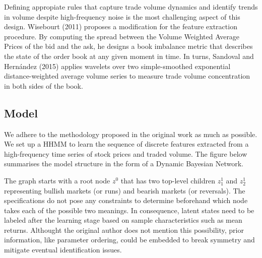 \documentclass[]{article}
\begin{document}
Defining appropiate rules that capture trade volume dynamics and
identify trends in volume despite high-frequency noise is the most
challenging aspect of this design. Wisebourt (2011) proposes a
modification for the feature extraction procedure. By computing the
spread between the Volume Weighted Average Prices of the bid and the
ask, he designs a book imbalance metric that describes the state of the
order book at any given moment in time. In turns, Sandoval and Hernández
(2015) applies wavelets over two simple-smoothed exponential
distance-weighted average volume series to measure trade volume
concentration in both sides of the book.

\subsection{Model}\label{model}

\label{sec:model}

We adhere to the methodology proposed in the original work as much as
possible. We set up a HHMM to learn the sequence of discrete features
extracted from a high-frequency time series of stock prices and traded
volume. The figure below summarises the model structure in the form of a
Dynamic Bayesian Network.

The graph starts with a root node \(z^0\) that has two top-level
children \(z_1^1\) and \(z_2^1\) representing bullish markets (or runs)
and bearish markets (or reversals). The specifications do not pose any
constraints to determine beforehand which node takes each of the
possible two meanings. In consequence, latent states need to be labeled
after the learning stage based on sample characteristics such as mean
returns. Althought the original author does not mention this
possibility, prior information, like parameter ordering, could be
embedded to break symmetry and mitigate eventual identification issues.

\end{document}
